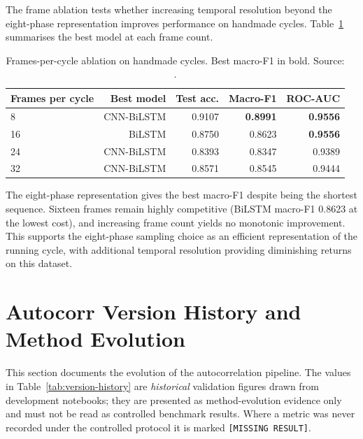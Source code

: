 The frame ablation tests whether increasing temporal resolution beyond the
eight-phase representation improves performance on handmade cycles. Table~\ref{tab:frames} summarises the best model at each frame count.

\begin{table}[htbp]
\centering
\caption[Frames-per-cycle ablation on handmade cycles. Source: \protect{}.]{Frames-per-cycle ablation on handmade cycles. Best macro-F1 in bold. Source: .}
\label{tab:frames}
\small
\begin{tabular}{lrrrr}
\toprule
Frames per cycle & Best model & Test acc. & Macro-F1 & ROC-AUC \\
\midrule
8 & CNN-BiLSTM & 0.9107 & \textbf{0.8991} & \textbf{0.9556} \\
16 & BiLSTM & 0.8750 & 0.8623 & \textbf{0.9556} \\
24 & CNN-BiLSTM & 0.8393 & 0.8347 & 0.9389 \\
32 & CNN-BiLSTM & 0.8571 & 0.8545 & 0.9444 \\
\bottomrule
\end{tabular}
\end{table}

The eight-phase representation gives the best macro-F1 despite being the
shortest sequence. Sixteen frames remain highly competitive
(BiLSTM macro-F1 0.8623 at the lowest cost), and increasing frame count
yields no monotonic improvement. This supports the eight-phase sampling
choice as an efficient representation of the running cycle, with additional
temporal resolution providing diminishing returns on this dataset.

\section{Autocorr Version History and Method Evolution}
\label{sec:version-history}

This section documents the evolution of the autocorrelation pipeline. The
values in Table~\ref{tab:version-history} are \emph{historical} validation
figures drawn from development notebooks; they are presented as method-evolution
evidence only and must not be read as controlled benchmark results. Where a
metric was never recorded under the controlled protocol it is marked
\texttt{[MISSING RESULT]}.


